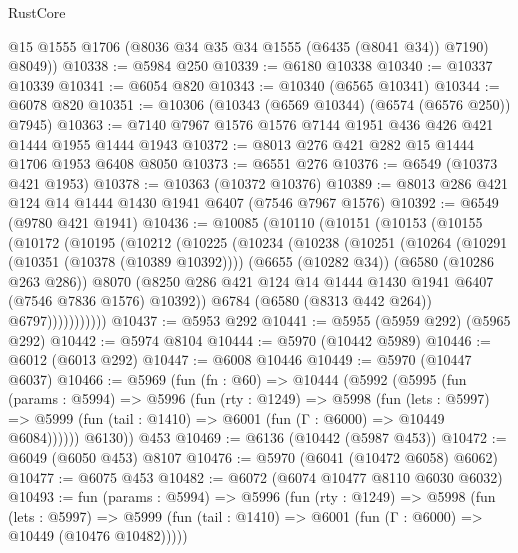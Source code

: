\begin{lexlean}{RustCore}
\begin{coremodule}
        @15
        @1555
        @1706
        (@8036 @34 @35 @34 @1555 (@6435 (@8041 @34)) @7190)
        @8049))
@10338 := @5984 @250
@10339 := @6180 @10338
@10340 := @10337 @10339
@10341 := @6054 @820
@10343 := @10340 (@6565 @10341)
@10344 := @6078 @820
@10351 := @10306 (@10343 (@6569 @10344) (@6574 (@6576 @250)) @7945)
@10363 := @7140 @7967 @1576 @1576 @7144 @1951 @436 @426 @421 @1444 @1955 @1444 @1943
@10372 := @8013 @276 @421 @282 @15 @1444 @1706 @1953 @6408 @8050
@10373 := @6551 @276
@10376 := @6549 (@10373 @421 @1953)
@10378 := @10363 (@10372 @10376)
@10389 := @8013 @286 @421 @124 @14 @1444 @1430 @1941 @6407 (@7546 @7967 @1576)
@10392 := @6549 (@9780 @421 @1941)
@10436 := @10085
    (@10110
      (@10151
        (@10153
          (@10155
            (@10172
              (@10195
                (@10212
                  (@10225
                    (@10234
                      (@10238
                        (@10251
                          (@10264
                            (@10291 (@10351 (@10378 (@10389 @10392))))
                            (@6655 (@10282 @34))
                            (@6580 (@10286 @263 @286))
                            @8070
                            (@8250
                              @286
                              @421
                              @124
                              @14
                              @1444
                              @1430
                              @1941
                              @6407
                              (@7546 @7836 @1576)
                              @10392))
                          @6784
                          (@6580 (@8313 @442 @264))
                          @6797)))))))))))
@10437 := @5953 @292
@10441 := @5955 (@5959 @292) (@5965 @292)
@10442 := @5974 @8104
@10444 := @5970 (@10442 @5989)
@10446 := @6012 (@6013 @292)
@10447 := @6008 @10446
@10449 := @5970 (@10447 @6037)
@10466 := @5969
    (fun (fn : @60) =>
    @10444
      (@5992
        (@5995
          (fun (params : @5994) =>
          @5996
            (fun (rty : @1249) =>
            @5998
              (fun (lets : @5997) =>
              @5999 (fun (tail : @1410) => @6001 (fun (Γ : @6000) => @10449 @6084))))))
        @6130))
    @453
@10469 := @6136 (@10442 (@5987 @453))
@10472 := @6049 (@6050 @453) @8107
@10476 := @5970 (@6041 (@10472 @6058) @6062)
@10477 := @6075 @453
@10482 := @6072 (@6074 @10477 @8110 @6030 @6032)
@10493 := fun (params : @5994) =>
  @5996
    (fun (rty : @1249) =>
    @5998
      (fun (lets : @5997) =>
      @5999 (fun (tail : @1410) => @6001 (fun (Γ : @6000) => @10449 (@10476 @10482)))))

\end{coremodule}
\end{lexlean}
